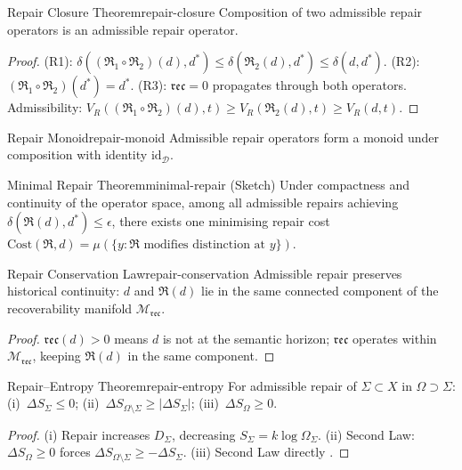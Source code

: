 \documentclass[12pt,twoside,openright]{book}
\newcommand{\repair}{\mathfrak{R}}
\newcommand{\reco}{\mathfrak{rec}}
\begin{document}
\begin{theorem}{Repair Closure Theorem}{repair-closure}
  Composition of two admissible repair operators is an
  admissible repair operator.
\end{theorem}
\begin{proof}
  (R1): $\delta((\repair_1\circ\repair_2)(d),d^*)
  \le\delta(\repair_2(d),d^*)\le\delta(d,d^*)$.
  (R2): $(\repair_1\circ\repair_2)(d^*)=d^*$.
  (R3): $\reco=0$ propagates through both operators.
  Admissibility: $V_R((\repair_1\circ\repair_2)(d),t)
  \ge V_R(\repair_2(d),t)\ge V_R(d,t)$.
\end{proof}

\begin{corollary}{Repair Monoid}{repair-monoid}
  Admissible repair operators form a monoid under
  composition with identity $\mathrm{id}_\mathcal{D}$.
\end{corollary}

\begin{theorem}{Minimal Repair Theorem}{minimal-repair}
  \textup{(Sketch)} Under compactness and continuity of
  the operator space, among all admissible repairs
  achieving $\delta(\repair(d),d^*)\le\epsilon$,
  there exists one minimising repair cost
  $\mathrm{Cost}(\repair,d)=
  \mu(\{y:\repair\text{ modifies distinction at }y\})$.
\end{theorem}

\begin{theorem}{Repair Conservation Law}{repair-conservation}
  Admissible repair preserves historical continuity:
  $d$ and $\repair(d)$ lie in the same connected
  component of the recoverability manifold
  $\mathcal{M}_\reco$.
\end{theorem}
\begin{proof}
  $\reco(d)>0$ means $d$ is not at the semantic horizon;
  $\mathfrak{rec}$ operates within $\mathcal{M}_\reco$,
  keeping $\repair(d)$ in the same component.
\end{proof}

\begin{theorem}{Repair--Entropy Theorem}{repair-entropy}
  For admissible repair of $\Sigma\subset X$ in
  $\Omega\supset\Sigma$:
  (i)~$\Delta S_\Sigma\le0$;
  (ii)~$\Delta S_{\Omega\setminus\Sigma}\ge|\Delta S_\Sigma|$;
  (iii)~$\Delta S_\Omega\ge0$.
\end{theorem}
\begin{proof}
  (i) Repair increases $D_\Sigma$, decreasing
  $S_\Sigma=k\log\Omega_\Sigma$.
  (ii) Second Law: $\Delta S_\Omega\ge0$ forces
  $\Delta S_{\Omega\setminus\Sigma}\ge-\Delta S_\Sigma$.
  (iii) Second Law directly \parencite{landauer1961irreversibility,
  bennett1982}.
\end{proof}
\end{document}
